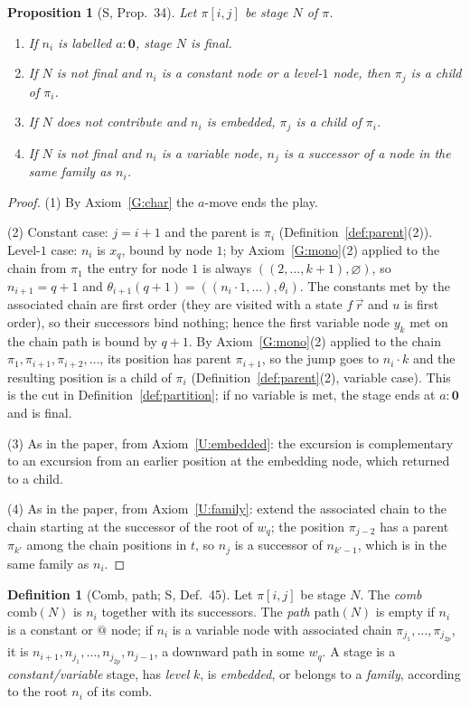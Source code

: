 \documentclass[11pt]{article}
\newcommand{\Ground}{\mathbf{0}}
\newcommand{\suc}[2]{#1{\cdot}#2}
\newcommand{\iv}[2]{\pi[#1,#2]}
\newcommand{\comb}{\mathrm{comb}}
\newcommand{\pth}{\mathrm{path}}
\theoremstyle{plain}
\newtheorem{proposition}[theorem]{Proposition}
\theoremstyle{definition}
\newtheorem{definition}[theorem]{Definition}
\theoremstyle{remark}
\begin{document}
\begin{proposition}[S, Prop.~34]\label{prop:stages}
Let $\iv ij$ be stage $N$ of $\pi$.
\begin{enumerate}
\item If $n_i$ is labelled $a:\Ground$, stage $N$ is final.
\item If $N$ is not final and $n_i$ is a constant node or a level-$1$
  node, then $\pi_j$ is a child of $\pi_i$.
\item If $N$ does not contribute and $n_i$ is embedded, $\pi_j$ is a
  child of $\pi_i$.
\item If $N$ is not final and $n_i$ is a variable node, $n_j$ is a
  successor of a node in the same family as $n_i$.
\end{enumerate}
\end{proposition}
\begin{proof}
(1) By Axiom~\ref{G:char} the $a$-move ends the play.

(2) Constant case: $j=i+1$ and the parent is $\pi_i$
(Definition~\ref{def:parent}(2)).  Level-$1$ case: $n_i$ is $x_q$, bound by
node $1$; by Axiom~\ref{G:mono}(2) applied to the chain from $\pi_1$ the
entry for node $1$ is always $((2,\dots,k+1),\varnothing)$, so
$n_{i+1}=q+1$ and $\theta_{i+1}(q+1)=((\suc{n_i}1,\dots),\theta_i)$.  The
constants met by the associated chain are first order (they are visited
with a state $f\,\vec r$ and $u$ is first order), so their successors
bind nothing; hence the first variable node $y_k$ met on the chain path
is bound by $q+1$.  By Axiom~\ref{G:mono}(2) applied to the chain
$\pi_1,\pi_{i+1},\pi_{i+2},\dots$, its position has parent $\pi_{i+1}$,
so the jump goes to $\suc{n_i}k$ and the resulting position is a child
of $\pi_i$ (Definition~\ref{def:parent}(2), variable case).  This is the
cut in Definition~\ref{def:partition}; if no variable is met, the stage
ends at $a:\Ground$ and is final.

(3) As in the paper, from Axiom~\ref{U:embedded}: the excursion is
complementary to an excursion from an earlier position at the
embedding node, which returned to a child.

(4) As in the paper, from Axiom~\ref{U:family}: extend the associated
chain to the chain starting at the successor of the root of $w_q$; the
position $\pi_{j-2}$ has a parent $\pi_{k'}$ among the chain positions
in $t$, so $n_j$ is a successor of $n_{k'-1}$, which is in the same
family as $n_i$.
\end{proof}

\begin{definition}[Comb, path; S, Def.~45]
Let $\iv ij$ be stage $N$.  The \emph{comb} $\comb(N)$ is $n_i$ together
with its successors.  The \emph{path} $\pth(N)$ is empty if $n_i$ is a
constant or $@$ node; if $n_i$ is a variable node with associated chain
$\pi_{j_1},\dots,\pi_{j_{2p}}$, it is
$n_{i+1},n_{j_1},\dots,n_{j_{2p}},n_{j-1}$, a downward path in some
$w_q$.  A stage is a \emph{constant/variable} stage, has \emph{level}
$k$, is \emph{embedded}, or belongs to a \emph{family}, according to
the root $n_i$ of its comb.
\end{definition}
\end{document}

